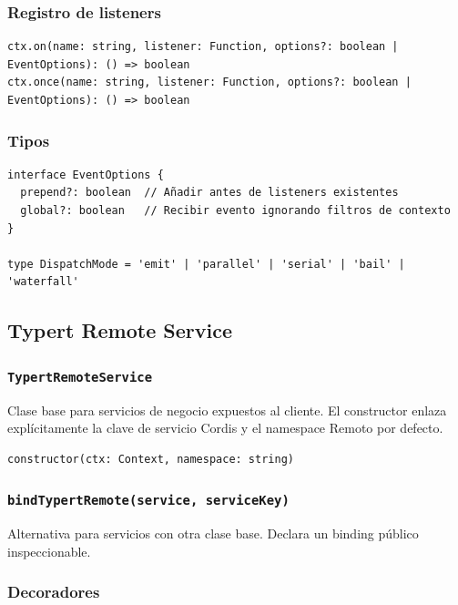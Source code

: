 \documentclass[11pt,a4paper]{article}
\begin{document}
\subsubsection*{Registro de listeners}


\begin{lstlisting}
ctx.on(name: string, listener: Function, options?: boolean | EventOptions): () => boolean
ctx.once(name: string, listener: Function, options?: boolean | EventOptions): () => boolean
\end{lstlisting}


\subsubsection*{Tipos}


\begin{lstlisting}
interface EventOptions {
  prepend?: boolean  // Añadir antes de listeners existentes
  global?: boolean   // Recibir evento ignorando filtros de contexto
}

type DispatchMode = 'emit' | 'parallel' | 'serial' | 'bail' | 'waterfall'
\end{lstlisting}


\subsection*{Typert Remote Service}


\subsubsection*{\texttt{TypertRemoteService}}


Clase base para servicios de negocio expuestos al cliente. El constructor enlaza explícitamente la clave de servicio Cordis y el namespace Remoto por defecto.


\begin{lstlisting}
constructor(ctx: Context, namespace: string)
\end{lstlisting}


\subsubsection*{\texttt{bindTypertRemote(service, serviceKey)}}


Alternativa para servicios con otra clase base. Declara un binding público inspeccionable.


\subsubsection*{Decoradores}
\end{document}
